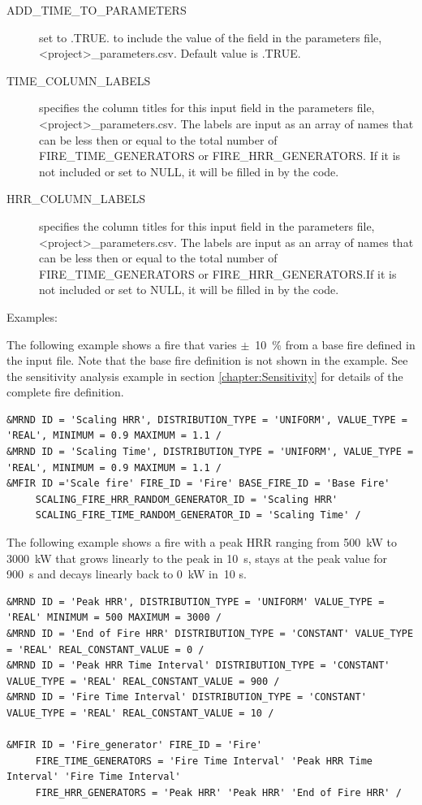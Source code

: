 \documentclass[12pt,twoside]{book}
\begin{document}
\begin{description}
  \item[ADD\_TIME\_TO\_PARAMETERS] set to .TRUE. to include the value of the field in the parameters file, {\ct <project>\_parameters.csv}. Default value is .TRUE.
  \item[TIME\_COLUMN\_LABELS] specifies the column titles for this input field in the parameters file, {\ct <project>\_parameters.csv}. The labels are input as an array of names that can be less then or equal to the total number of {\ct FIRE\_TIME\_GENERATORS} or {\ct FIRE\_HRR\_GENERATORS}. If it is not included or set to {\ct NULL}, it will be filled in by the code.
  \item[HRR\_COLUMN\_LABELS] specifies the column titles for this input field in the parameters file, {\ct <project>\_parameters.csv}. The labels are input as an array of names that can be less then or equal to the total number of {\ct FIRE\_TIME\_GENERATORS} or {\ct FIRE\_HRR\_GENERATORS}.If it is not included or set to {\ct NULL}, it will be filled in by the code.
\end{description}

\vspace{\baselineskip}
\noindent Examples:

The following example shows a fire that varies $\pm$~10~\% from a base fire defined in the input file.  Note that the base fire definition is not shown in the example. See the sensitivity analysis example in section \ref{chapter:Sensitivity} for details of the complete fire definition.

\begin{lstlisting}[basicstyle=\scriptsize]
&MRND ID = 'Scaling HRR', DISTRIBUTION_TYPE = 'UNIFORM', VALUE_TYPE = 'REAL', MINIMUM = 0.9 MAXIMUM = 1.1 /
&MRND ID = 'Scaling Time', DISTRIBUTION_TYPE = 'UNIFORM', VALUE_TYPE = 'REAL', MINIMUM = 0.9 MAXIMUM = 1.1 /
&MFIR ID ='Scale fire' FIRE_ID = 'Fire' BASE_FIRE_ID = 'Base Fire'
     SCALING_FIRE_HRR_RANDOM_GENERATOR_ID = 'Scaling HRR'
     SCALING_FIRE_TIME_RANDOM_GENERATOR_ID = 'Scaling Time' /
\end{lstlisting}

The following example shows a fire with a peak HRR ranging from 500~kW to 3000~kW that grows linearly to the peak in 10~s, stays at the peak value for 900~s and decays linearly back to 0~kW in~10 s.

\begin{lstlisting}[basicstyle=\scriptsize]
&MRND ID = 'Peak HRR', DISTRIBUTION_TYPE = 'UNIFORM' VALUE_TYPE = 'REAL' MINIMUM = 500 MAXIMUM = 3000 /
&MRND ID = 'End of Fire HRR' DISTRIBUTION_TYPE = 'CONSTANT' VALUE_TYPE = 'REAL' REAL_CONSTANT_VALUE = 0 /
&MRND ID = 'Peak HRR Time Interval' DISTRIBUTION_TYPE = 'CONSTANT' VALUE_TYPE = 'REAL' REAL_CONSTANT_VALUE = 900 /
&MRND ID = 'Fire Time Interval' DISTRIBUTION_TYPE = 'CONSTANT' VALUE_TYPE = 'REAL' REAL_CONSTANT_VALUE = 10 /

&MFIR ID = 'Fire_generator' FIRE_ID = 'Fire'
     FIRE_TIME_GENERATORS = 'Fire Time Interval' 'Peak HRR Time Interval' 'Fire Time Interval'
     FIRE_HRR_GENERATORS = 'Peak HRR' 'Peak HRR' 'End of Fire HRR' /
\end{lstlisting}
\end{document}
